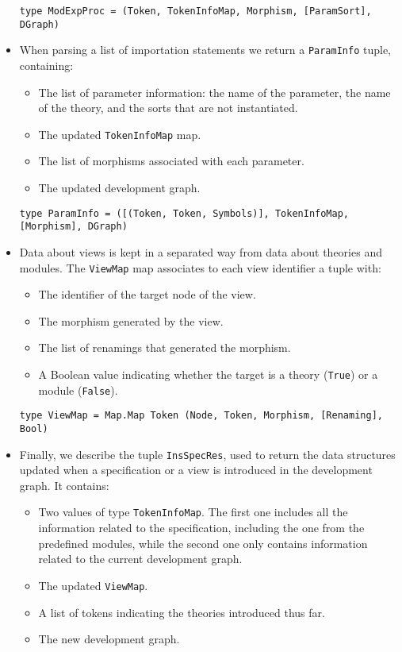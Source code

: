 \begin{itemize}
{\codesize
\begin{verbatim}
type ModExpProc = (Token, TokenInfoMap, Morphism, [ParamSort], DGraph)
\end{verbatim}
}

\item When parsing a list of importation statements we return a
\verb"ParamInfo" tuple, containing:

\begin{itemize}
\item The list of parameter information: the name of the parameter,
the name of the theory, and the sorts that are not instantiated.
\item The updated \verb"TokenInfoMap" map.
\item The list of morphisms associated with each parameter.
\item The updated development graph.
\end{itemize}

{\codesize
\begin{verbatim}
type ParamInfo = ([(Token, Token, Symbols)], TokenInfoMap, [Morphism], DGraph)
\end{verbatim}
}

\item Data about views is kept in a separated way from data about theories
and modules. The \verb"ViewMap" map associates to each view identifier a
tuple with:

\begin{itemize}
\item The identifier of the target node of the view.
\item The morphism generated by the view.
\item The list of renamings that generated the morphism.
\item A Boolean value indicating whether the target is a theory
(\verb"True") or a module (\verb"False").
\end{itemize}

{\codesize
\begin{verbatim}
type ViewMap = Map.Map Token (Node, Token, Morphism, [Renaming], Bool)
\end{verbatim}
}

\item Finally, we describe the tuple \verb"InsSpecRes",
used to return the data structures
updated when a specification or a view is introduced in the development
graph. It contains:

\begin{itemize}
\item Two values of type \verb"TokenInfoMap". The first one includes all
the information related to the specification, including the one from the
predefined modules, while the
second one only contains information related to the current development
graph.
\item The updated \verb"ViewMap".
\item A list of tokens indicating the theories introduced thus far.
\item The new development graph.
\end{itemize}


\end{itemize}

